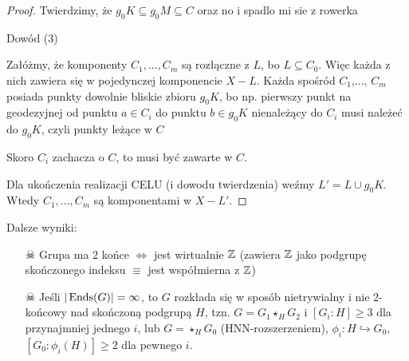 \begin{proof}
  Twierdzimy, że $g_0K\subseteq g_0M\subseteq C$ oraz 
  {\Large\color{red}no i spadlo mi sie z rowerka}

  Dowód (3)

  Załóżmy, że komponenty $C_1,...,C_m$ są rozłączne z $L$, bo $L\subseteq C_0$. Więc każda z nich zawiera się w pojedynczej komponencie $X-L$. Każda spośród $C_1$,..., $C_m$ posiada punkty dowolnie bliskie zbioru $g_0K$, bo np. pierwszy punkt na geodezyjnej od punktu $a\in C_i$ do punktu $b\in g_0K$ nienależący do $C_i$  musi należeć do $g_0K$, czyli punkty leżące w $C$

  Skoro $C_i$ zachacza o $C$, to musi być zawarte w $C$.

  Dla ukończenia realizacji CELU (i dowodu twierdzenia) weźmy $L'=L\cup g_0K$. Wtedy $C_1,..., C_m$ są komponentami w $X-L'$.
\end{proof}

Dalsze wyniki:
\begin{enumerate}
  \item[$\skull$] Grupa ma $2$ końce $\iff$ jest wirtualnie $\mathbb{Z}$ (zawiera $\mathbb{Z}$ jako podgrupę skończonego indeksu $\equiv$ jest współmierna z $\mathbb{Z}$)
  \item[$\skull$] Jeśli $|\operatorname{Ends}(G)|=\infty$, to $G$ rozkłada się w sposób  nietrywialny i nie $2$-końcowy nad skończoną podgrupą $H$, tzn. $G=G_1\star_H G_2$ i $[G_i:H]\geq 3$ dla przynajmniej jednego $i$, lub $G=\star_H G_0$ (HNN-rozszerzeniem), $\phi_i:H\hookrightarrow G_0$, $[G_0:\phi_i(H)]\geq 2$ dla pewnego $i$.
\end{enumerate}

